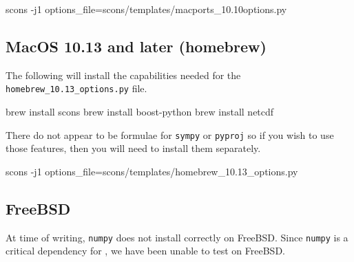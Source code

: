 \begin{shellCode}
scons -j1 options_file=scons/templates/macports_10.10options.py
\end{shellCode}


\subsection{MacOS 10.13 and later (homebrew)}\label{sec:homebrewsrc}

The following will install the capabilities needed for the \texttt{homebrew_10.13_options.py} file.

\begin{shellCode}
brew install scons
brew install boost-python
brew install netcdf
\end{shellCode}

There do not appear to be formulae for \texttt{sympy} or \texttt{pyproj} so if you wish to use those features, then
you will need to install them separately.


\begin{shellCode}
scons -j1 options_file=scons/templates/homebrew_10.13_options.py
\end{shellCode}


\subsection{FreeBSD}\label{sec:freebsdsrc}

At time of writing, \texttt{numpy} does not install correctly on FreeBSD.
Since \texttt{numpy} is a critical dependency for \escript, we have been unable to test on FreeBSD.


